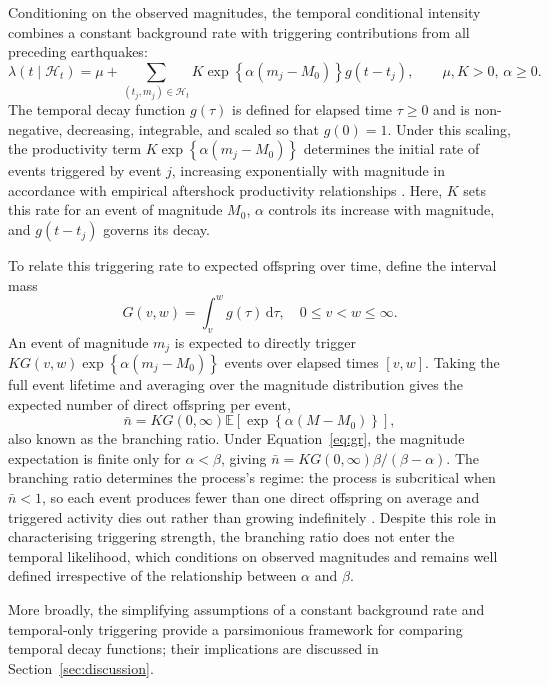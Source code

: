 \documentclass{statsmsc}
\begin{document}
Conditioning on the observed magnitudes, the temporal conditional intensity combines a constant background rate with triggering contributions from all preceding earthquakes:
\begin{equation*} 
\lambda(t \mid \mathcal{H}_t) = \mu+\sum_{(t_j,m_j) \in \mathcal{H}_t}K\exp\left\{\alpha(m_j-M_0)\right\} g(t-t_j), \qquad \mu, K >0, \, \alpha \geq 0.
\end{equation*}
The temporal decay function $g(\tau)$ is defined for elapsed time $\tau \geq 0$ and is non-negative, decreasing, integrable, and scaled so that $g(0)=1$. Under this scaling, the productivity term $K\exp\left\{\alpha(m_j-M_0)\right\}$ determines the initial rate of events triggered by event $j$, increasing exponentially with magnitude in accordance with empirical aftershock productivity relationships \citep{utsu1971aftershocks}. Here, $K$ sets this rate for an event of magnitude $M_0$, $\alpha$ controls its increase with magnitude, and $g(t-t_j)$ governs its decay. 

To relate this triggering rate to expected offspring over time, define the interval mass
\begin{equation*}
G(v,w) = \int_v^w g(\tau) \, \mathrm{d}\tau, \quad0\leq v < w \leq \infty.
\end{equation*}
An event of magnitude $m_j$ is expected to directly trigger $KG(v,w)\exp\left\{\alpha(m_j-M_0)\right\}$ events over elapsed times $[v,w]$. Taking the full event lifetime and averaging over the magnitude distribution gives the expected number of direct offspring per event, 
\begin{equation} \label{eq:branching}
\bar{n} = K  G(0,\infty) \mathbb{E}\left[\exp \left\{\alpha \left(M-M_0 \right) \right\} \right],
\end{equation}
also known as the branching ratio. Under Equation~\eqref{eq:gr}, the magnitude expectation is finite only for $\alpha < \beta$, giving $\bar{n} = K  G(0,\infty) \beta/(\beta-\alpha)$. The branching ratio determines the process's regime: the process is subcritical when $\bar{n} < 1$, so each event produces fewer than one direct offspring on average and triggered activity dies out rather than growing indefinitely \citep{helmstetter2002subcritical}. Despite this role in characterising triggering strength, the branching ratio does not enter the temporal likelihood, which conditions on observed magnitudes and remains well defined irrespective of the relationship between $\alpha$ and $\beta$.

More broadly, the simplifying assumptions of a constant background rate and temporal-only triggering provide a parsimonious framework for comparing temporal decay functions; their implications are discussed in Section~\ref{sec:discussion}.
\end{document}
